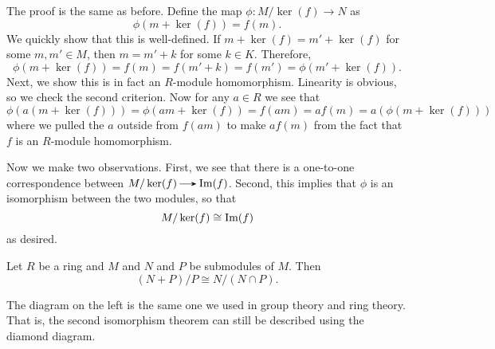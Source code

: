 \begin{prf}
    The proof is the same as before. Define the map $\phi:
    M/\ker(f) \to N$ as 
    \[ 
        \phi(m + \ker(f)) = f(m).
    \]
    \textcolor{NavyBlue}{We quickly show that this is well-defined.} If $m + \ker(f) =
    m' + \ker(f)$ for some $m, m' \in M$, then $m = m' + k$ for
    some $k \in K$. Therefore, 
    \[
        \phi(m + \ker(f)) = f(m) = f(m' + k) = f(m') = \phi(m' + \ker(f)).
    \]
    \textcolor{NavyBlue}{Next, we show this is in fact an $R$-module homomorphism.}
    Linearity is obvious, so we check the second criterion. Now
    for any $a \in R$ we see that 
    \[
        \phi(a(m + \ker(f))) = \phi(am + \ker(f)) = f(am) = af(m) = a(\phi(m + \ker(f)))
    \]
    where we pulled the $a$ outside from $f(am)$ to make $af(m)$
    from the fact that $f$ is an $R$-module homomorphism. 

    \textcolor{NavyBlue}{Now we make two observations.} First, we
    see that there is a one-to-one correspondence between
    $M/\ker(f) \to \im(f)$. Second, this implies that $\phi$ is an
    isomorphism between the two modules, so that 
    \[
        M/\ker(f) \cong \mbox{Im}(f)
    \]
    as desired.
\end{prf}

\begin{thm}
    Let $R$ be a ring and $M$ and $N$ and $P$ be submodules of
    $M$. Then 
    \[
        (N + P)/P \cong N/(N \cap P).
    \]
    \vspace{-0.8cm}
\end{thm}

\begin{minipage}{0.35 \textwidth}
    \begin{figure}[H]
    \end{figure}
\end{minipage} \hfill
\begin{minipage}{0.6\textwidth}
    The diagram on the left is the same one we used in group
    theory and ring theory. That is, the second isomorphism
    theorem can still be described using the diamond diagram. 
\end{minipage}  

